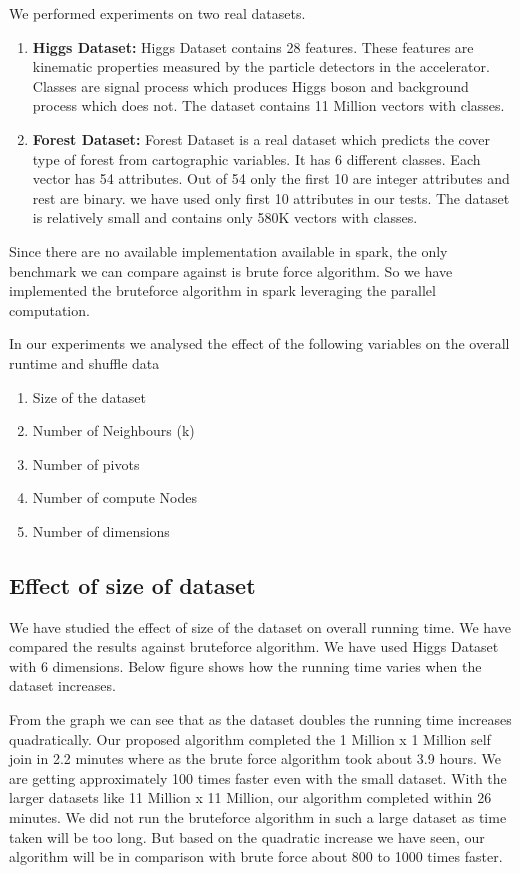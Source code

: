 \documentclass[12pt]{article}
\begin{document}
We performed experiments on two real datasets.
\begin{enumerate}
\item \textbf{Higgs Dataset:}
Higgs Dataset contains 28 features. These features are kinematic
properties measured by the particle detectors in the
accelerator. Classes are signal process which produces Higgs boson and
background process which does not. The dataset contains 11 Million
vectors with classes.

\item \textbf{Forest Dataset:}
Forest Dataset is a real dataset which predicts the cover type of
forest from cartographic variables. It has 6 different classes. Each
vector has 54 attributes. Out of 54 only the first 10 are integer
attributes and rest are binary. we have used only first 10 attributes
in our tests. The dataset is relatively small and contains only 580K
vectors with classes.
\end{enumerate}


Since there are no available implementation available in spark, the
only benchmark we can compare against is brute force algorithm. So we
have implemented the bruteforce algorithm in spark leveraging the
parallel computation.

In our experiments we analysed the effect of the following variables on the
overall runtime and shuffle data
\begin{enumerate}
\item Size of the dataset
\item Number of Neighbours (k)
\item Number of pivots
\item Number of compute Nodes
\item Number of dimensions
\end{enumerate}


\subsection{Effect of size of dataset}

We have studied the effect of size of the dataset on overall running
time. We have compared the results against bruteforce algorithm.
We have used Higgs Dataset with 6 dimensions. Below figure shows how
the running time varies when the dataset increases.

From the graph we can see that as the dataset doubles the running time
increases quadratically. Our proposed algorithm
completed the 1 Million x 1 Million self join
in 2.2 minutes where as the brute force algorithm took about 3.9
hours. We are getting approximately 100 times faster even with the small
dataset. With the larger datasets like 11 Million x 11 Million, our
algorithm completed within 26 minutes. We did not run the bruteforce
algorithm in such a large dataset as time taken will be too long. But
based on the quadratic increase we have seen, our algorithm will be in comparison with
brute force about 800 to 1000 times faster.
\end{document}
